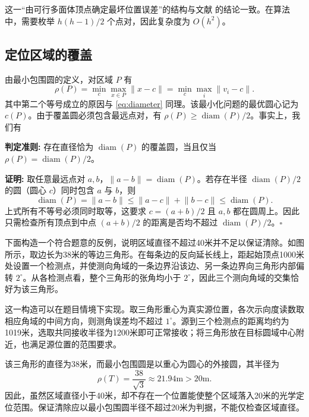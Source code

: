 \documentclass[UTF8,a4paper,zihao=-4,fontset=none]{ctexart}
\begin{document}
这一“由可行多面体顶点确定最坏位置误差”的结构与文献 \cite{Gholami2015} 的结论一致。在算法中，需要枚举 \(h(h-1)/2\) 个点对，因此复杂度为 \(O(h^2)\)。

\subsection{定位区域的覆盖}

由最小包围圆的定义，对区域 \(P\) 有
\begin{equation}
  \rho(P)=\min_c\max_{x\in P}\lVert x-c\rVert
  =\min_c\max_i\lVert v_i-c\rVert .
  \label{eq:mincircle}
\end{equation}
其中第二个等号成立的原因与 \eqref{eq:diameter} 同理。该最小化问题的最优圆心记为 \(c(P)\)。由于覆盖圆必须包含最远点对，有 \(\rho(P)\ge\operatorname{diam}(P)/2\)。事实上，我们有

\textbf{判定准则: } 存在直径恰为 \(\operatorname{diam}(P)\) 的覆盖圆，当且仅当 \(\rho(P)=\operatorname{diam}(P)/2\)。

\textbf{证明: } 取任意最远点对 \(a,b\)，\(\lVert a-b\rVert=\operatorname{diam}(P)\)。若存在半径 \(\operatorname{diam}(P)/2\) 的圆（圆心 \(c\)）同时包含 \(a\) 与 \(b\)，则
\begin{equation}
  \operatorname{diam}(P)=\lVert a-b\rVert\le\lVert a-c\rVert+\lVert b-c\rVert\le\operatorname{diam}(P) .
\end{equation}
上式所有不等号必须同时取等，这要求 \(c=(a+b)/2\) 且 \(a,b\) 都在圆周上。因此只需检查所有顶点到中点 \((a+b)/2\) 的距离是否均不超过 \(\operatorname{diam}(P)/2\)。\(\square\)

下面构造一个符合题意的反例，说明区域直径不超过40米并不足以保证清除。如图所示，取边长为38米的等边三角形。在每条边的反向延长线上，距起始顶点1000米处设置一个检测点，并使测向角域的一条边界沿该边、另一条边界向三角形内部偏转 \(2^\circ\)。从各检测点看，整个三角形的张角均小于 \(2^\circ\)，因此三个测向角域的交集恰好为该三角形。

这一构造可以在题目情境下实现。取三角形重心为真实源位置，各次示向度读数取相应角域的中间方向，则测角误差均不超过 \(1^\circ\)。源到三个检测点的距离均约为1019米，选取共同接收半径为1200米即可正常接收；将三角形放在目标圆域中心附近，也满足源位置的范围要求。

该三角形的直径为38米，而最小包围圆是以重心为圆心的外接圆，其半径为
\begin{equation}
  \rho(T)=\frac{38}{\sqrt{3}}\approx21.94\mathrm{m}>20\mathrm{m}.
  \label{eq:counterexample}
\end{equation}
因此，虽然区域直径小于40米，却不存在一个位置能使整个区域落入20米的光学定位范围。保证清除应以最小包围圆半径不超过20米为判据，不能仅检查区域直径。
\end{document}
